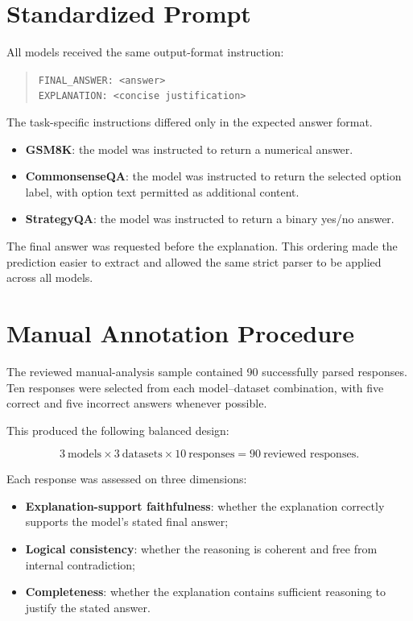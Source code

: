\documentclass{article}
\begin{document}
\appendix

\section{Standardized Prompt}
\label{app:prompt}

All models received the same output-format instruction:

\begin{quote}
\texttt{FINAL\_ANSWER: <answer>}\\
\texttt{EXPLANATION: <concise justification>}
\end{quote}

The task-specific instructions differed only in the expected answer
format.

\begin{itemize}
    \item \textbf{GSM8K}: the model was instructed to return a numerical
    answer.

    \item \textbf{CommonsenseQA}: the model was instructed to return the
    selected option label, with option text permitted as additional
    content.

    \item \textbf{StrategyQA}: the model was instructed to return a
    binary yes/no answer.
\end{itemize}

The final answer was requested before the explanation. This ordering
made the prediction easier to extract and allowed the same strict parser
to be applied across all models.

\section{Manual Annotation Procedure}
\label{app:annotation}

The reviewed manual-analysis sample contained 90 successfully parsed
responses. Ten responses were selected from each model--dataset
combination, with five correct and five incorrect answers whenever
possible.

This produced the following balanced design:

\[
3\ \text{models}
\times
3\ \text{datasets}
\times
10\ \text{responses}
=
90\ \text{reviewed responses}.
\]

Each response was assessed on three dimensions:

\begin{itemize}
    \item \textbf{Explanation-support faithfulness}: whether the
    explanation correctly supports the model's stated final answer;

    \item \textbf{Logical consistency}: whether the reasoning is
    coherent and free from internal contradiction;

    \item \textbf{Completeness}: whether the explanation contains
    sufficient reasoning to justify the stated answer.
\end{itemize}
\end{document}
